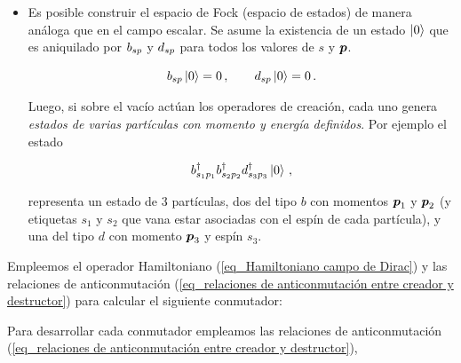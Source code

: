 \begin{itemize}
\item Es posible construir el espacio de Fock (espacio de estados) de manera análoga que en el campo escalar. Se asume la existencia de un estado $\ket{0}$ que es aniquilado por $b_{sp}$ y $d_{sp}$ para todos los valores de $s$ y $\vb*{p}$. 

\begin{equation}
	b_{sp} \ket{0} = 0 \, ,\qquad d_{sp} \ket{0} = 0 \, .
\end{equation}

Luego, si sobre el vacío actúan los operadores de creación, cada uno genera \emph{estados de varias partículas con momento y energía definidos}. Por ejemplo el estado 

\begin{equation*}
	b^\dag_{s_1 p_1} b^\dag_{s_2 p_2} d^\dag_{s_3 p_3} \ket{0} \, ,
\end{equation*}

representa un estado de 3 partículas, dos del tipo $b$ con momentos $\vb*{p}_1$ y $\vb*{p}_2$ (y etiquetas $s_1$ y $s_2$ que vana estar asociadas con el espín de cada partícula), y una del tipo  $d$ con momento $\vb*{p}_3$ y espín $s_3$.
\end{itemize}


Empleemos el operador Hamiltoniano (\ref{eq_Hamiltoniano campo de Dirac})  y las relaciones de anticonmutación (\ref{eq_relaciones de anticonmutación entre creador y destructor}) para calcular el siguiente conmutador:


Para desarrollar cada conmutador empleamos las relaciones de anticonmutación (\ref{eq_relaciones de anticonmutación entre creador y destructor}),

